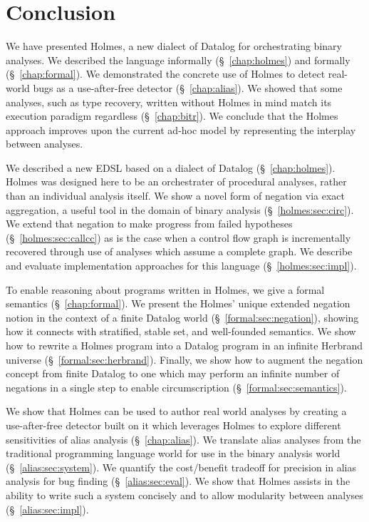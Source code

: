 \chapter{Conclusion}
\label{sec:conc}
We have presented Holmes, a new dialect of Datalog for orchestrating binary analyses.
We described the language informally (\S~\ref{chap:holmes}) and formally (\S~\ref{chap:formal}).
We demonstrated the concrete use of Holmes to detect real-world bugs as a use-after-free detector (\S~\ref{chap:alias}).
We showed that some analyses, such as type recovery, written without Holmes in mind match its execution paradigm regardless (\S~\ref{chap:bitr}).
We conclude that the Holmes approach improves upon the current ad-hoc model by representing the interplay between analyses.

We described a new EDSL based on a dialect of Datalog (\S~\ref{chap:holmes}).
Holmes was designed here to be an orchestrater of procedural analyses, rather than an individual analysis itself.
We show a novel form of negation via exact aggregation, a useful tool in the domain of binary analysis (\S~\ref{holmes:sec:circ}).
We extend that negation to make progress from failed hypotheses (\S~\ref{holmes:sec:callcc}) as is the case when a control flow graph is incrementally recovered through use of analyses which assume a complete graph.
We describe and evaluate implementation approaches for this language (\S~\ref{holmes:sec:impl}).

To enable reasoning about programs written in Holmes, we give a formal semantics (\S~\ref{chap:formal}).
We present the Holmes' unique extended negation notion in the context of a finite Datalog world (\S~\ref{formal:sec:negation}), showing how it connects with stratified, stable set, and well-founded semantics. 
We show how to rewrite a Holmes program into a Datalog program in an infinite Herbrand universe (\S~\ref{formal:sec:herbrand}).
Finally, we show how to augment the negation concept from finite Datalog to one which may perform an infinite number of negations in a single step to enable circumscription (\S~\ref{formal:sec:semantics}).

We show that Holmes can be used to author real world analyses by creating a use-after-free detector built on it which leverages Holmes to explore different sensitivities of alias analysis (\S~\ref{chap:alias}).
We translate alias analyses from the traditional programming language world for use in the binary analysis world (\S~\ref{alias:sec:system}).
We quantify the cost/benefit tradeoff for precision in alias analysis for bug finding (\S~\ref{alias:sec:eval}).
We show that Holmes assists in the ability to write such a system concisely and to allow modularity between analyses (\S~\ref{alias:sec:impl}).

